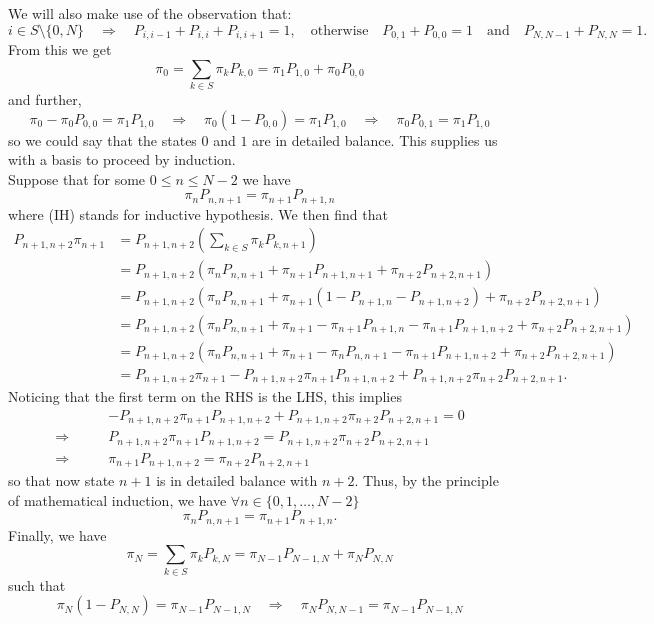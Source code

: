 \documentclass[11pt, letterpaper]{article}
\begin{document}
    We will also make use of the observation that:
    \[i\in S\setminus\{0,N\}\quad\Rightarrow\quad P_{i,i-1}+P_{i,i}+P_{i,i+1}=1,\quad\text{otherwise}\quad P_{0,1}+P_{0,0}=1\quad\text{and}\quad P_{N,N-1}+P_{N,N}=1.\tag{4}\]
    From this we get
    \[\pi_0=\sum_{k\in S}\pi_kP_{k,0}=\pi_1P_{1,0}+\pi_0P_{0,0}\]
    and further,
    \[\pi_0-\pi_0P_{0,0}=\pi_1P_{1,0}\quad\Rightarrow\quad\pi_0(1-P_{0,0})=\pi_1P_{1,0}\quad\Rightarrow\quad \pi_0 P_{0,1}=\pi_1 P_{1,0}\]
    so we could say that the states $0$ and $1$ are in detailed balance. This supplies us with a basis to proceed by induction. \\[10pt]
    Suppose that for some $0\leq n\leq N-2$ we have
    \[\pi_n P_{n,n+1}=\pi_{n+1}P_{n+1,n}\tag{IH}\]
    where (IH) stands for inductive hypothesis. We then find that
    \begin{align*}
        P_{n+1,n+2}\pi_{n+1}&=P_{n+1,n+2}\left(\sum_{k\in S}\pi_kP_{k,n+1}\right)\\
        &=P_{n+1,n+2}(\pi_nP_{n,n+1}+\pi_{n+1}P_{n+1,n+1}+\pi_{n+2}P_{n+2,n+1})\\
        &=P_{n+1,n+2}(\pi_nP_{n,n+1}+\pi_{n+1}(1-P_{n+1,n}-P_{n+1,n+2})+\pi_{n+2}P_{n+2,n+1})\tag{by 4}\\
        &=P_{n+1,n+2}(\pi_nP_{n,n+1}+\pi_{n+1}-\pi_{n+1}P_{n+1,n}-\pi_{n+1}P_{n+1,n+2}+\pi_{n+2}P_{n+2,n+1})\\
        &=P_{n+1,n+2}(\pi_nP_{n,n+1}+\pi_{n+1}-\pi_{n}P_{n,n+1}-\pi_{n+1}P_{n+1,n+2}+\pi_{n+2}P_{n+2,n+1})\tag{IH}\\
        &=P_{n+1,n+2}\pi_{n+1}-P_{n+1,n+2}\pi_{n+1}P_{n+1,n+2}+P_{n+1,n+2}\pi_{n+2}P_{n+2,n+1}.
    \end{align*}
    Noticing that the first term on the RHS is the LHS, this implies
    \begin{align*}
        &-P_{n+1,n+2}\pi_{n+1}P_{n+1,n+2}+P_{n+1,n+2}\pi_{n+2}P_{n+2,n+1}=0\\
        \Rightarrow\qquad&P_{n+1,n+2}\pi_{n+1}P_{n+1,n+2}=P_{n+1,n+2}\pi_{n+2}P_{n+2,n+1}\\
        \Rightarrow\qquad&\pi_{n+1}P_{n+1,n+2}=\pi_{n+2}P_{n+2,n+1}
    \end{align*}
    so that now state $n+1$ is in detailed balance with $n+2$. Thus, by the principle of mathematical induction, we have $\forall n\in\{0,1,\dots,N-2\}$
    \[\pi_nP_{n,n+1}=\pi_{n+1}P_{n+1,n}.\tag{5}\] 
    Finally, we have
    \[\pi_N=\sum_{k\in S}\pi_k P_{k,N}=\pi_{N-1}P_{N-1,N}+\pi_N P_{N,N}\]
    such that
    \[\pi_N(1-P_{N,N})=\pi_{N-1}P_{N-1,N}\quad\Rightarrow\quad \pi_NP_{N,N-1}=\pi_{N-1}P_{N-1,N}\tag{6}\]
\end{document}
